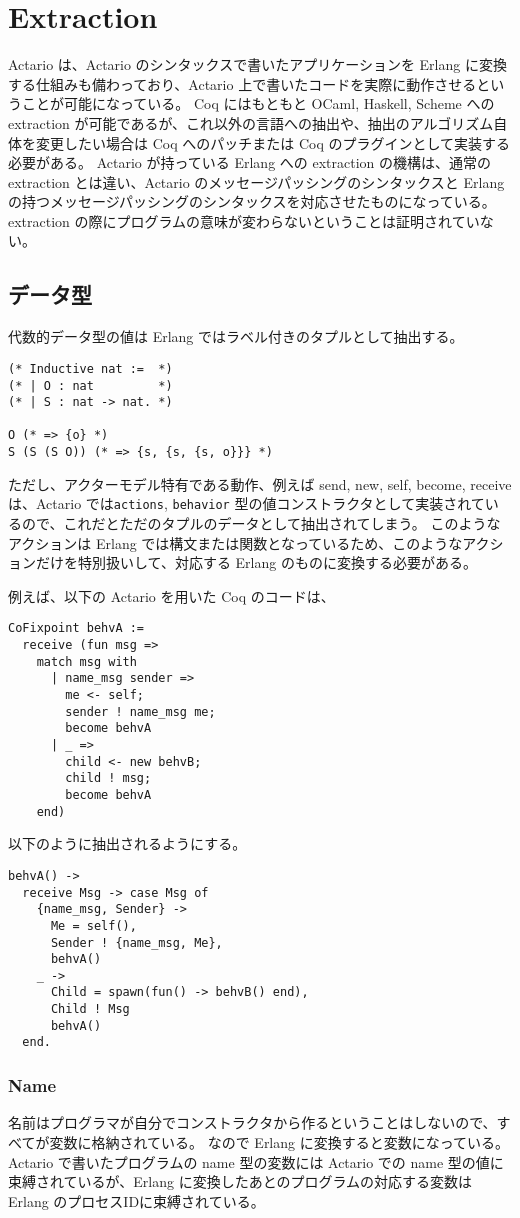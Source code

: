 \section{Extraction}
Actario は、Actario のシンタックスで書いたアプリケーションを Erlang に変換する仕組みも備わっており、Actario 上で書いたコードを実際に動作させるということが可能になっている。
Coq にはもともと OCaml, Haskell, Scheme への extraction が可能であるが、これ以外の言語への抽出や、抽出のアルゴリズム自体を変更したい場合は Coq へのパッチまたは Coq のプラグインとして実装する必要がある。
Actario が持っている Erlang への extraction の機構は、通常の extraction とは違い、Actario のメッセージパッシングのシンタックスと Erlang の持つメッセージパッシングのシンタックスを対応させたものになっている。
extraction の際にプログラムの意味が変わらないということは証明されていない。

\subsection{データ型}

代数的データ型の値は Erlang ではラベル付きのタプルとして抽出する。

\begin{lstlisting}
(* Inductive nat :=  *)
(* | O : nat         *)
(* | S : nat -> nat. *)

O (* => {o} *)
S (S (S O)) (* => {s, {s, {s, o}}} *)
\end{lstlisting}

ただし、アクターモデル特有である動作、例えば send, new, self, become, receive は、Actario では\texttt{actions}, \texttt{behavior} 型の値コンストラクタとして実装されているので、これだとただのタプルのデータとして抽出されてしまう。
このようなアクションは Erlang では構文または関数となっているため、このようなアクションだけを特別扱いして、対応する Erlang のものに変換する必要がある。

例えば、以下の Actario を用いた Coq のコードは、

\begin{lstlisting}
CoFixpoint behvA :=
  receive (fun msg =>
    match msg with
      | name_msg sender =>
        me <- self;
        sender ! name_msg me;
        become behvA
      | _ =>
        child <- new behvB;
        child ! msg;
        become behvA
    end)
\end{lstlisting}

以下のように抽出されるようにする。

\begin{lstlisting}
behvA() ->
  receive Msg -> case Msg of
    {name_msg, Sender} ->
      Me = self(),
      Sender ! {name_msg, Me},
      behvA()
    _ ->
      Child = spawn(fun() -> behvB() end),
      Child ! Msg
      behvA()
  end.
\end{lstlisting}

\subsubsection{Name}
名前はプログラマが自分でコンストラクタから作るということはしないので、すべてが変数に格納されている。
なので Erlang に変換すると変数になっている。
Actario で書いたプログラムの name 型の変数には Actario での name 型の値に束縛されているが、Erlang に変換したあとのプログラムの対応する変数は Erlang のプロセスIDに束縛されている。
